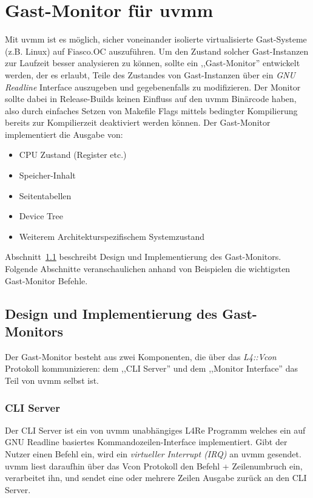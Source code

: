 \section{Gast-Monitor für uvmm}

Mit uvmm ist es möglich, sicher voneinander isolierte virtualisierte
Gast-Systeme (z.B. Linux) auf Fiasco.OC auszuführen. Um den Zustand solcher
Gast-Instanzen zur Laufzeit besser analysieren zu können, sollte ein
,,Gast-Monitor'' entwickelt werden, der es erlaubt, Teile des Zustandes von
Gast-Instanzen über ein \textit{GNU Readline} Interface auszugeben und
gegebenenfalls zu modifizieren. Der Monitor sollte dabei in Release-Builds
keinen Einfluss auf den uvmm Binärcode haben, also durch einfaches Setzen von
Makefile Flags mittels bedingter Kompilierung bereits zur Kompilierzeit
deaktiviert werden können. Der Gast-Monitor implementiert die Ausgabe von:

\begin{itemize}
  \item CPU Zustand (Register etc.)
  \item Speicher-Inhalt
  \item Seitentabellen
  \item Device Tree
  \item Weiterem Architekturspezifischem Systemzustand
\end{itemize}

Abschnitt~\ref{sec:uvmm_monitor_design} beschreibt Design und Implementierung
des Gast-Monitors. Folgende Abschnitte veranschaulichen anhand von Beispielen
die wichtigsten Gast-Monitor Befehle.

\subsection{Design und Implementierung des Gast-Monitors}
\label{sec:uvmm_monitor_design}

Der Gast-Monitor besteht aus zwei Komponenten, die über das \textit{L4::Vcon}
Protokoll kommunizieren: dem ,,CLI Server'' und dem ,,Monitor Interface'' das
Teil von uvmm selbst ist.

\subsubsection{CLI Server}


Der CLI Server ist ein von uvmm unabhängiges L4Re Programm welches ein auf GNU
Readline basiertes Kommandozeilen-Interface implementiert. Gibt der Nutzer
einen Befehl ein, wird ein \textit{virtueller Interrupt (IRQ)} an uvmm gesendet.
uvmm liest daraufhin über das Vcon Protokoll den Befehl + Zeilenumbruch ein,
verarbeitet ihn, und sendet eine oder mehrere Zeilen Ausgabe zurück an den CLI
Server.

